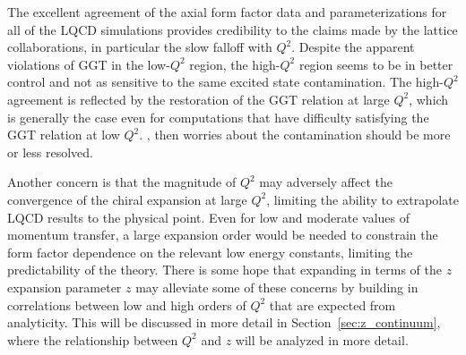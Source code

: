 The excellent agreement of the axial form factor data and parameterizations
 for all of the LQCD simulations provides credibility to the claims
 made by the lattice collaborations, in particular the slow falloff with $Q^2$.
Despite the apparent violations of GGT in the low-$Q^2$ region,
 the high-$Q^2$ region seems to be in better control and not as sensitive to
 the same excited state contamination.
The high-$Q^2$ agreement is reflected by the restoration of the GGT relation at large $Q^2$,
 which is generally the case even for computations that have difficulty satisfying
 the GGT relation at low $Q^2$.
,
 then worries about the contamination should be more or less resolved.

Another concern is that the magnitude of $Q^2$ may adversely affect
 the convergence of the chiral expansion at large $Q^2$,
 limiting the ability to extrapolate LQCD results to the physical point.
Even for low and moderate values of momentum transfer,
 a large expansion order would be needed to constrain the form factor
 dependence on the relevant low energy constants,
 limiting the predictability of the theory.
There is some hope that expanding in terms of the $z$ expansion parameter $z$
 may alleviate some of these concerns by building in correlations between
 low and high orders of $Q^2$ that are expected from analyticity.
This will be discussed in more detail in Section~\ref{sec:z_continuum},
 where the relationship between $Q^2$ and $z$ will be analyzed in more detail.

